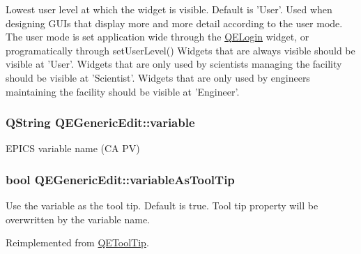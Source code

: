 Lowest user level at which the widget is visible. Default is 'User'. Used when designing GUIs that display more and more detail according to the user mode. The user mode is set application wide through the \hyperlink{classQELogin}{QELogin} widget, or programatically through setUserLevel() Widgets that are always visible should be visible at 'User'. Widgets that are only used by scientists managing the facility should be visible at 'Scientist'. Widgets that are only used by engineers maintaining the facility should be visible at 'Engineer'. \hypertarget{classQEGenericEdit_a4d5d7d260857021e0714ec47e0bba9f7}{
\subsubsection[{variable}]{\setlength{\rightskip}{0pt plus 5cm}QString QEGenericEdit::variable}}
\label{classQEGenericEdit_a4d5d7d260857021e0714ec47e0bba9f7}
EPICS variable name (CA PV) \hypertarget{classQEGenericEdit_a9173bf85137b00076d02c7d1f88323f9}{
\subsubsection[{variableAsToolTip}]{\setlength{\rightskip}{0pt plus 5cm}bool QEGenericEdit::variableAsToolTip}}
\label{classQEGenericEdit_a9173bf85137b00076d02c7d1f88323f9}
Use the variable as the tool tip. Default is true. Tool tip property will be overwritten by the variable name. 

Reimplemented from \hyperlink{classQEToolTip}{QEToolTip}.


